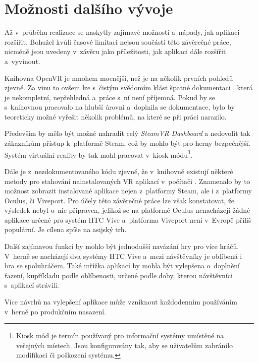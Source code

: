 \section{Možnosti dalšího
vývoje}\label{moux17enosti-dalux161uxedho-vuxfdvoje}

Až v~průběhu realizace se naskytly zajímavé možnosti a~nápady, jak
aplikaci rozšířit. Bohužel kvůli časové limitaci nejsou součástí této
závěrečné práce, nicméně jsou uvedeny v~závěru jako příležitosti, jak
aplikaci dále rozšířit a~vyvinout.

Knihovna OpenVR je mnohem mocnější, než je na několik prvních pohledů
zjevné. Za vinu to ovšem lze s~čistým svědomím klást špatné dokumentaci \autocite{openvrdocs},
která je nekompletní, nepřehledná a~práce s~ní není příjemná. Pokud by
se s~knihovnou pracovalo na hlubší úrovni a~doplnila se dokumentace,
bylo by teoreticky možné vyřešit několik problémů, na které se při práci narazilo.

Především by mělo být možné nahradit celý \emph{SteamVR Dashboard} a
nedovolit tak zákazníkům přístup k~platformě Steam, což by mohlo být pro
herny bezpečnější. Systém virtuální reality by tak mohl pracovat
v~kiosk módu\footnote{Kiosk mód je termín používaný pro informační systémy umístěné na veřejných místech. Jsou konfigurovány tak, aby se uživatelům zabránilo modifikaci či poškození systému.}. 

Dále je z~nezdokumentovaného kódu zjevné, že
v~knihovně existují některé metody pro stahování nainstalovaných VR
aplikací v~počítači \autocite{openvrhidden}. Znamenalo by to možnost zobrazit instalované aplikace
nejen z~platformy Steam, ale i z~platformy Oculus, či Viveport. Pro
účely této závěrečné práce lze však konstatovat, že výsledek nebyl o~nic
připraven, jelikož se na platformě Oculus nenacházejí žádné aplikace
určené pro systém HTC Vive a~platforma Viveport není v~Evropě příliš
populární. Je cílena spíše na asijský trh. \autocite{viveportasia}

Další zajímavou funkcí by mohlo být jednodušší navázání hry pro více
hráčů. V~herně se nacházejí dva systémy HTC Vive a~mezi návštěvníky je
oblíbená i hra se spoluhráčem. Také mřížka aplikací by mohla být vylepšena
o~doplnění řazení, kupříkladu podle oblíbenosti, určené podle doby, kterou
návštěvníci s~aplikací strávili.

Více návrhů na vylepšení aplikace může vzniknout každodenním používáním
v~herně po produkčním nasazení.
